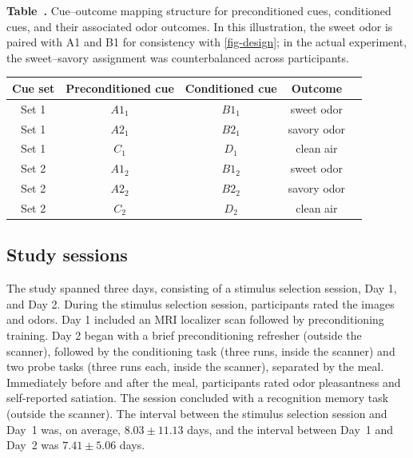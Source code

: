 \documentclass[12pt,letterpaper]{article}
\begin{document}
\par\bigskip\begingroup
{}


\par\noindent\textbf{Table~\thetable. }Cue–outcome mapping structure for preconditioned cues, conditioned cues, and their associated odor outcomes.
In this illustration, the sweet odor is paired with A1 and B1 for consistency with \autoref{fig-design};
in the actual experiment, the sweet–savory assignment was counterbalanced across participants.
\par

\label{tab:cue-mapping}
\small\setlength{\tabcolsep}{4pt}\begin{tabular}{ccccc}
\hline
\textbf{Cue set} & \textbf{Preconditioned cue} & \textbf{Conditioned cue} & \textbf{Outcome} \\
\hline
Set 1 & $A1_{1}$ & $B1_{1}$ & sweet odor \\
Set 1 & $A2_{1}$ & $B2_{1}$ & savory odor \\
Set 1 & $C_{1}$ & $D_{1}$ & clean air \\
Set 2 & $A1_{2}$ & $B1_{2}$ & sweet odor \\
Set 2 & $A2_{2}$ & $B2_{2}$ & savory odor \\
Set 2 & $C_{2}$ & $D_{2}$ & clean air \\
\hline
\end{tabular}

\par\endgroup\bigskip





\subsection*{Study sessions}

The study spanned three days, consisting of a stimulus selection session, Day 1, and Day 2. During the stimulus selection session, participants rated the images and odors. Day 1 included an MRI localizer scan followed by preconditioning training. Day 2 began with a brief preconditioning refresher (outside the scanner), followed by the conditioning task (three runs, inside the scanner) and two probe tasks (three runs each, inside the scanner), separated by the meal. Immediately before and after the meal, participants rated odor pleasantness and self-reported satiation. The session concluded with a recognition memory task (outside the scanner). The interval between the stimulus selection session and Day~1 was, on average, \(8.03 \pm 11.13\) days, and the interval between Day~1 and Day~2 was \(7.41 \pm 5.06\) days.
\end{document}
